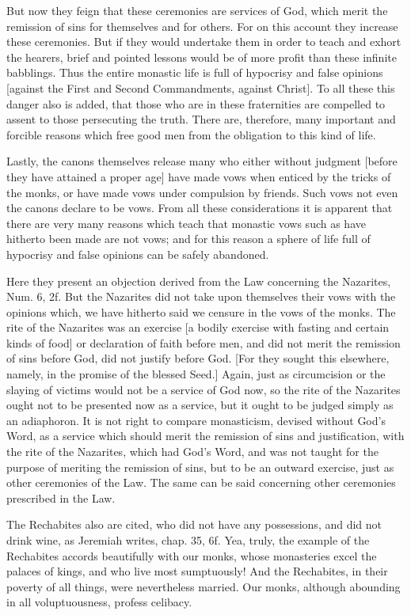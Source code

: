 But now they feign that these ceremonies are services of God, which
merit the remission of sins for themselves and for others.  For on
this account they increase these ceremonies.  But if they would
undertake them in order to teach and exhort the hearers, brief and
pointed lessons would be of more profit than these infinite babblings.
Thus the entire monastic life is full of hypocrisy and false
opinions [against the First and Second Commandments, against Christ].
To all these this danger also is added, that those who are in these
fraternities are compelled to assent to those persecuting the truth.
There are, therefore, many important and forcible reasons which free
good men from the obligation to this kind of life.

Lastly, the canons themselves release many who either without
judgment [before they have attained a proper age] have made vows when
enticed by the tricks of the monks, or have made vows under
compulsion by friends.  Such vows not even the canons declare to be
vows.  From all these considerations it is apparent that there are
very many reasons which teach that monastic vows such as have
hitherto been made are not vows; and for this reason a sphere of life
full of hypocrisy and false opinions can be safely abandoned.

Here they present an objection derived from the Law concerning the
Nazarites, Num. 6, 2f.  But the Nazarites did not take upon
themselves their vows with the opinions which, we have hitherto said
we censure in the vows of the monks.  The rite of the Nazarites was
an exercise [a bodily exercise with fasting and certain kinds of
food] or declaration of faith before men, and did not merit the
remission of sins before God, did not justify before God.  [For they
sought this elsewhere, namely, in the promise of the blessed Seed.]
Again, just as circumcision or the slaying of victims would not be a
service of God now, so the rite of the Nazarites ought not to be
presented now as a service, but it ought to be judged simply as an
adiaphoron.  It is not right to compare monasticism, devised without
God's Word, as a service which should merit the remission of sins and
justification, with the rite of the Nazarites, which had God's Word,
and was not taught for the purpose of meriting the remission of sins,
but to be an outward exercise, just as other ceremonies of the Law.
The same can be said concerning other ceremonies prescribed in the
Law.

The Rechabites also are cited, who did not have any possessions, and
did not drink wine, as Jeremiah writes, chap. 35, 6f.  Yea, truly,
the example of the Rechabites accords beautifully with our monks,
whose monasteries excel the palaces of kings, and who live most
sumptuously!  And the Rechabites, in their poverty of all things,
were nevertheless married.  Our monks, although abounding in all
voluptuousness, profess celibacy.

